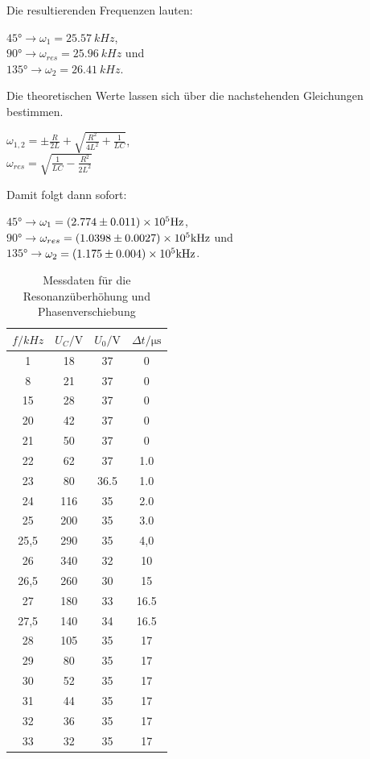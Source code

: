 \documentclass[
  bibliography=totoc,     %
  captions=tableheading,  %
  titlepage=firstiscover, %
]{scrartcl}
\begin{document}
    Die resultierenden Frequenzen lauten:
    \begin{center}
        $45°$$\rightarrow$$\omega_1=\SI[]{25.57}[]{kHz}$,\\
        $90°$$\rightarrow$$\omega_{res}=\SI[]{25.96}[]{kHz}$ und\\
        $135°$$\rightarrow$$\omega_2=\SI[]{26.41}[]{kHz}$.\\
    \end{center}
    Die theoretischen Werte lassen sich über die nachstehenden Gleichungen bestimmen.
    \begin{center}
        $\omega_{1,2}=\pm \frac{R}{2L}+\sqrt{\frac{R^2}{4L^2}+\frac{1}{LC}}$,\\
        $\omega_{res}=\sqrt{\frac{1}{LC}-\frac{R^2}{2L^2}}$
    \end{center}
  Damit folgt dann sofort:
  \begin{center}
      $45°$$\rightarrow$$\omega_1=(2.774\pm 0.011) \times 10^5\si[]{Hz}$,\\
      $90°$$\rightarrow$$\omega_{res}=(1.0398\pm 0.0027)\times 10^5\si[]{kHz}$ und\\
      $135°$$\rightarrow$$\omega_2=(1.175\pm 0.004)\times 10^5\si[]{kHz}$.\\
  
  \end{center}
  
  \begin{table}
    \centering
    \caption{Messdaten für die Resonanzüberhöhung und Phasenverschiebung}
    \label{tab:tab1}
    \begin{tabular}{c c c c}
      \toprule
      $f / \si{kHz}$ & $U_C / \si {\volt}$ & $U_0 / \si{\volt}$ & $\Delta t / \si{\micro\second}$\\
      \midrule
      1 & 18 & 37 & 0\\
      8 & 21 & 37 & 0\\
      15 & 28 & 37 & 0\\
      20 & 42 & 37 & 0\\
      21 & 50 & 37 & 0\\
      22 & 62 & 37 & 1.0\\
      23 & 80 & 36.5 & 1.0\\
      24 & 116 & 35 & 2.0\\
      25 & 200 & 35 & 3.0\\
      25,5 & 290 & 35 & 4,0\\
      26 & 340 & 32 & 10 \\
      26,5 & 260 & 30 & 15\\
      27 & 180 & 33 & 16.5\\
      27,5 & 140 & 34 & 16.5\\
      28 & 105 & 35 & 17\\
      29 & 80 & 35 & 17\\
      30 & 52 & 35 & 17\\
      31 & 44 & 35 & 17\\
      32 & 36 & 35 & 17\\
      33 & 32 & 35 & 17\\
      \bottomrule
    \end{tabular}
  \end{table}
\end{document}
